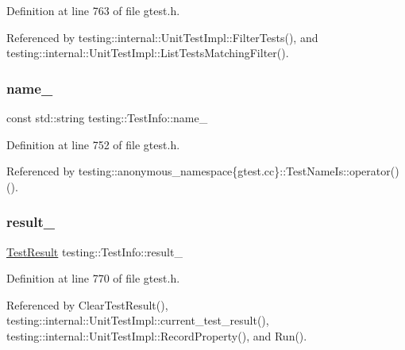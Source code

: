Definition at line 763 of file gtest.\+h.



Referenced by testing\+::internal\+::\+Unit\+Test\+Impl\+::\+Filter\+Tests(), and testing\+::internal\+::\+Unit\+Test\+Impl\+::\+List\+Tests\+Matching\+Filter().

\mbox{\label{classtesting_1_1TestInfo_a6bed52b7c3d66c8c5eac5fa2aaadba55}} 
\subsubsection{\texorpdfstring{name\+\_\+}{name\_}}
{\footnotesize\ttfamily const std\+::string testing\+::\+Test\+Info\+::name\+\_\+\hspace{0.3cm}{\ttfamily [private]}}



Definition at line 752 of file gtest.\+h.



Referenced by testing\+::anonymous\+\_\+namespace\{gtest.\+cc\}\+::\+Test\+Name\+Is\+::operator()().

\mbox{\label{classtesting_1_1TestInfo_a108fd469897a8d4e5c4361947a5ed785}} 
\subsubsection{\texorpdfstring{result\+\_\+}{result\_}}
{\footnotesize\ttfamily \hyperlink{classtesting_1_1TestResult}{Test\+Result} testing\+::\+Test\+Info\+::result\+\_\+\hspace{0.3cm}{\ttfamily [private]}}



Definition at line 770 of file gtest.\+h.



Referenced by Clear\+Test\+Result(), testing\+::internal\+::\+Unit\+Test\+Impl\+::current\+\_\+test\+\_\+result(), testing\+::internal\+::\+Unit\+Test\+Impl\+::\+Record\+Property(), and Run().

\mbox{\label{classtesting_1_1TestInfo_a89c3d8fb8b565532c34d3123240fd5cf}} 
